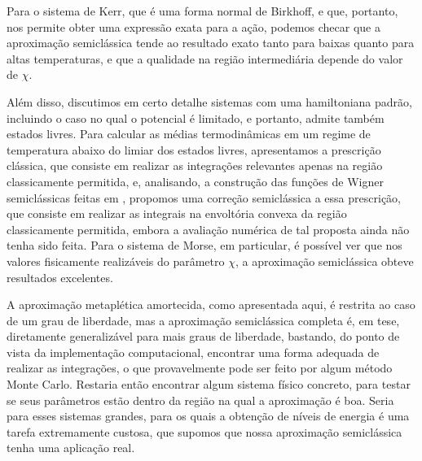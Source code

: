 \documentclass[
	12pt,
	oneside,			%
	a4paper,			%
	english,			%
	brazil				%
	]{abntex2}
\theoremstyle{definition}
\begin{document}
Para o sistema de Kerr, que é uma forma normal de Birkhoff, e que, portanto, nos permite obter uma expressão exata para a ação, podemos checar que a aproximação semiclássica tende ao resultado exato tanto para baixas quanto para altas temperaturas, e que a qualidade na região intermediária depende do valor de $\chi$.

Além disso, discutimos em certo detalhe sistemas com uma hamiltoniana padrão, incluindo o caso no qual o potencial é limitado, e portanto, admite também estados livres. Para calcular as médias termodinâmicas em um regime de temperatura abaixo do limiar dos estados livres, apresentamos a prescrição clássica, que consiste em realizar as integrações relevantes apenas na região classicamente permitida, e, analisando, a construção das funções de Wigner semiclássicas feitas em \cite{berry1977semi}, propomos uma correção semiclássica a essa prescrição, que consiste em realizar as integrais na envoltória convexa da região classicamente permitida, embora a avaliação numérica de tal proposta ainda não tenha sido feita. Para o sistema de Morse, em particular, é possível ver que nos valores fisicamente realizáveis do parâmetro $\chi$, a aproximação semiclássica obteve resultados excelentes.

A aproximação metaplética amortecida, como apresentada aqui, é restrita ao caso de um grau de liberdade, mas a aproximação semiclássica completa é, em tese, diretamente generalizável para mais graus de liberdade, bastando, do ponto de vista da implementação computacional, encontrar uma forma adequada de realizar as integrações, o que provavelmente pode ser feito por algum método Monte Carlo. Restaria então encontrar algum sistema físico concreto, para testar se seus parâmetros estão dentro da região na qual a aproximação é boa. Seria para esses sistemas grandes, para os quais a obtenção de níveis de energia é uma tarefa extremamente custosa, que supomos que nossa aproximação semiclássica tenha uma aplicação real.

\postextual
\end{document}
